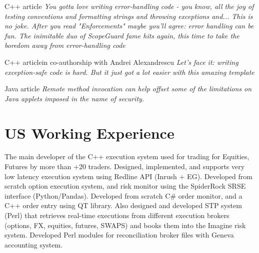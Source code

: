 \documentclass[8pt,a4paper,sans]{moderncv}
\begin{document}
        {C++ article}
        {\textit{You gotta love writing error-handling code - you know, all the joy of testing conventions and
            formatting strings and throwing exceptions and... This is no joke. After you read "Enforcements"
            maybe you'll agree: error handling can be fun. The inimitable duo of ScopeGuard fame hits again,
            this time to take the boredom away from error-handling code}}
 
        {C++ article}{in co-authorship with Andrei Alexandrescu}
        {\textit{Let's face it: writing exception-safe code is hard. But it just got a lot easier with this amazing template}}

        {Java article}{}
        {\textit{Remote method invocation can help offset some of the limitations on Java applets imposed in the name of security.}}

\section{US Working Experience}

        {The main developer of the C++ execution system used for trading for Equities, Futures by more than +20 traders. 
          Designed, implemented, and supports very low latency execution system using Redline API (Inrush + EG).
          Developed from scratch option execution system, and risk monitor using the SpiderRock SRSE interface (Python/Pandas).
          Developed from scratch C\# order monitor, and a C++ order entry using QT library.
          Also designed and developed STP system (Perl) that retrieves real-time executions from
          different execution brokers (options, FX, equities, futures, SWAPS) and books them into the Imagine risk system.
          Developed Perl modules for reconciliation broker files with Geneva accounting system.}
\end{document}
